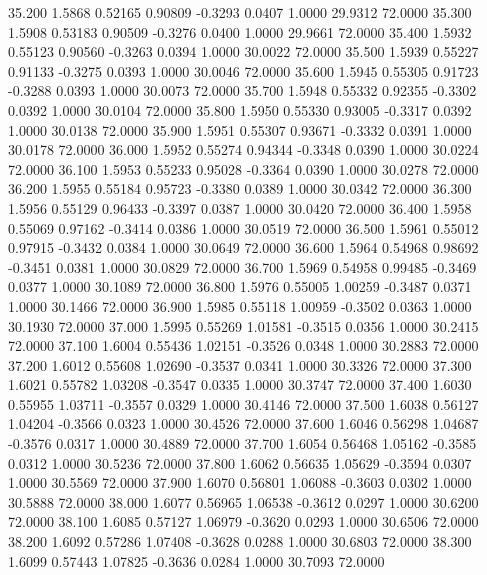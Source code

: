   35.200   1.5868   0.52165   0.90809  -0.3293   0.0407   1.0000  29.9312  72.0000
  35.300   1.5908   0.53183   0.90509  -0.3276   0.0400   1.0000  29.9661  72.0000
  35.400   1.5932   0.55123   0.90560  -0.3263   0.0394   1.0000  30.0022  72.0000
  35.500   1.5939   0.55227   0.91133  -0.3275   0.0393   1.0000  30.0046  72.0000
  35.600   1.5945   0.55305   0.91723  -0.3288   0.0393   1.0000  30.0073  72.0000
  35.700   1.5948   0.55332   0.92355  -0.3302   0.0392   1.0000  30.0104  72.0000
  35.800   1.5950   0.55330   0.93005  -0.3317   0.0392   1.0000  30.0138  72.0000
  35.900   1.5951   0.55307   0.93671  -0.3332   0.0391   1.0000  30.0178  72.0000
  36.000   1.5952   0.55274   0.94344  -0.3348   0.0390   1.0000  30.0224  72.0000
  36.100   1.5953   0.55233   0.95028  -0.3364   0.0390   1.0000  30.0278  72.0000
  36.200   1.5955   0.55184   0.95723  -0.3380   0.0389   1.0000  30.0342  72.0000
  36.300   1.5956   0.55129   0.96433  -0.3397   0.0387   1.0000  30.0420  72.0000
  36.400   1.5958   0.55069   0.97162  -0.3414   0.0386   1.0000  30.0519  72.0000
  36.500   1.5961   0.55012   0.97915  -0.3432   0.0384   1.0000  30.0649  72.0000
  36.600   1.5964   0.54968   0.98692  -0.3451   0.0381   1.0000  30.0829  72.0000
  36.700   1.5969   0.54958   0.99485  -0.3469   0.0377   1.0000  30.1089  72.0000
  36.800   1.5976   0.55005   1.00259  -0.3487   0.0371   1.0000  30.1466  72.0000
  36.900   1.5985   0.55118   1.00959  -0.3502   0.0363   1.0000  30.1930  72.0000
  37.000   1.5995   0.55269   1.01581  -0.3515   0.0356   1.0000  30.2415  72.0000
  37.100   1.6004   0.55436   1.02151  -0.3526   0.0348   1.0000  30.2883  72.0000
  37.200   1.6012   0.55608   1.02690  -0.3537   0.0341   1.0000  30.3326  72.0000
  37.300   1.6021   0.55782   1.03208  -0.3547   0.0335   1.0000  30.3747  72.0000
  37.400   1.6030   0.55955   1.03711  -0.3557   0.0329   1.0000  30.4146  72.0000
  37.500   1.6038   0.56127   1.04204  -0.3566   0.0323   1.0000  30.4526  72.0000
  37.600   1.6046   0.56298   1.04687  -0.3576   0.0317   1.0000  30.4889  72.0000
  37.700   1.6054   0.56468   1.05162  -0.3585   0.0312   1.0000  30.5236  72.0000
  37.800   1.6062   0.56635   1.05629  -0.3594   0.0307   1.0000  30.5569  72.0000
  37.900   1.6070   0.56801   1.06088  -0.3603   0.0302   1.0000  30.5888  72.0000
  38.000   1.6077   0.56965   1.06538  -0.3612   0.0297   1.0000  30.6200  72.0000
  38.100   1.6085   0.57127   1.06979  -0.3620   0.0293   1.0000  30.6506  72.0000
  38.200   1.6092   0.57286   1.07408  -0.3628   0.0288   1.0000  30.6803  72.0000
  38.300   1.6099   0.57443   1.07825  -0.3636   0.0284   1.0000  30.7093  72.0000
